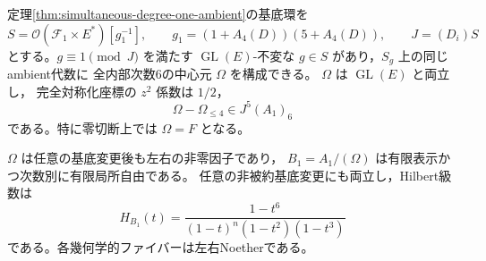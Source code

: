 \begin{theorem}[次数1の全方向の有限型中心超曲面族]
\label{thm:simultaneous-degree-one-central-family}
定理\ref{thm:simultaneous-degree-one-ambient}の基底環を
\[
 S=\mathcal O(\mathcal F_1\times E^*)[g_1^{-1}],
 \qquad g_1=(1+A_4(D))(5+A_4(D)),\qquad J=(D_i)S
\]
とする。$g\equiv1\pmod J$ を満たす
$\operatorname{GL}(E)$-不変な $g\in S$ があり，$S_g$ 上の同じambient代数に
全内部次数6の中心元 $\Omega$ を構成できる。
$\Omega$ は $\operatorname{GL}(E)$ と両立し，
完全対称化座標の $z^2$ 係数は $1/2$，
\[
 \Omega-\Omega_{\le4}\in J^5(A_1)_6
\]
である。特に零切断上では $\Omega=F$ となる。

$\Omega$ は任意の基底変更後も左右の非零因子であり，
$B_1=A_1/(\Omega)$ は有限表示かつ次数別に有限局所自由である。
任意の非被約基底変更にも両立し，Hilbert級数は
\[
 H_{B_1}(t)=\frac{1-t^6}{(1-t)^n(1-t^2)(1-t^3)}
\]
である。各幾何学的ファイバーは左右Noetherである。
\end{theorem}
